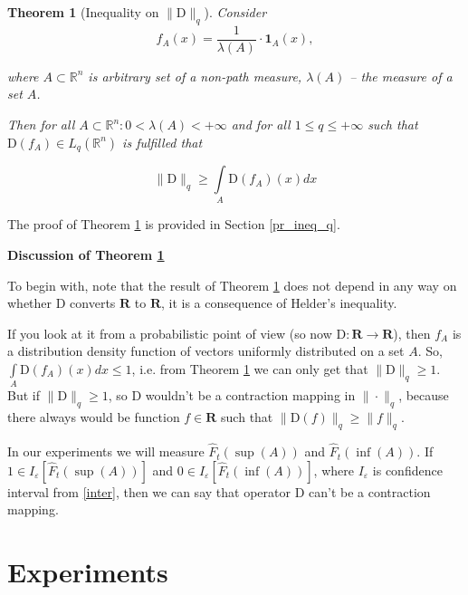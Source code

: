 \documentclass{article}
\newtheorem{theorem}{Theorem}
\begin{document}
    \begin{theorem}[Inequality on $\|\text{D}\|_q$] \label{ineq_q}
        Consider 
        \begin{equation}\label{f_R}
            f_A(x) = \dfrac{1}{\lambda(A)} \cdot \textbf{1}_{A}(x),
        \end{equation}

        where $A \subset \mathbb{R}^n$ is arbitrary set of a non-path measure, $\lambda(A)$ -- the measure of a set $A$.

        Then for all $A \subset \mathbb{R}^n :  0 < \lambda(A) < +\infty$ and for all $1 \leq q \leq +\infty$ such that $\text{D}(f_A) \in L_q(\mathbb{R}^n)$ is fulfilled that  

        \begin{equation}\label{int_f_R}
            \|\text{D}\|_q \geq \int\limits_{A} \text{D}(f_A)(x)dx
        \end{equation}
    \end{theorem}

    The proof of Theorem \ref{ineq_q} is provided in Section \ref{pr_ineq_q}.
        
    \textbf{Discussion of Theorem \ref{ineq_q}}

    To begin with, note that the result of Theorem \ref{ineq_q} does not depend in any way on whether $\text{D}$ converts $\mathbf{R}$ to $\mathbf{R}$, it is a consequence of Helder's inequality. 
    
    If you look at it from a probabilistic point of view (so now $\text{D} : \mathbf{R} \to \mathbf{R}$), then $f_A$ is a distribution density function of vectors uniformly distributed on a set $A$. So, $\int\limits_{A} \text{D}(f_A)(x)dx \leq 1$, i.e. from Theorem \ref{ineq_q} we can only get that $\|\text{D}\|_q \geq 1$. But if $\|\text{D}\|_q \geq 1$, so $\text{D}$ wouldn't be a contraction mapping in $\|\cdot\|_q$, because there always would be function $f \in \mathbf{R}$ such that $\|\text{D}(f)\|_q \geq \|f\|_q$.

    In our experiments we will measure $\hat{F}_t(\sup(A))$ and $\hat{F}_t(\inf(A))$. If $1 \in I_{\varepsilon}[\hat{F}_t(\sup(A))]$ and $0 \in I_{\varepsilon}[\hat{F}_t(\inf(A))]$, where $I_{\varepsilon}$ is confidence interval from \eqref{inter}, then we can say that operator $\text{D}$ can't be a contraction mapping.

\section{Experiments} \label{Experiments}
\end{document}
